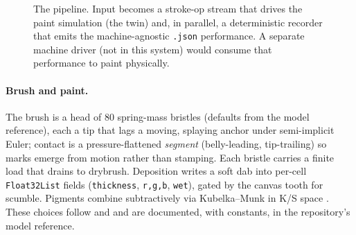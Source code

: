 \documentclass[11pt]{article}
\newcommand{\code}[1]{\texttt{\small #1}}
\begin{document}
\begin{figure}[t]
\centering
{}
\caption{The pipeline. Input becomes a stroke-op stream that drives the paint
simulation (the twin) and, in parallel, a deterministic recorder that emits the
machine-agnostic \code{.json} performance. A separate machine driver (not in this
system) would consume that performance to paint physically.}
\label{fig:pipeline}
\end{figure}

\paragraph{Brush and paint.} The brush is a head of \num{80} spring-mass bristles
(defaults from the model reference), each a tip that lags a moving, splaying
anchor under semi-implicit Euler; contact is a pressure-flattened
\emph{segment} (belly-leading, tip-trailing) so marks emerge from motion rather
than stamping. Each bristle carries a finite load that drains to drybrush.
Deposition writes a soft dab into per-cell \code{Float32List} fields
(\code{thickness}, \code{r,g,b}, \code{wet}), gated by the canvas tooth for
scumble. Pigments combine subtractively via Kubelka--Munk in K/S space
\citep{haase1992pigment,sochorova2021pigment}. These choices follow
\citet{baxter2004impasto} and \citet{chen2015wetbrush} and are documented, with
constants, in the repository's model reference.
\end{document}
